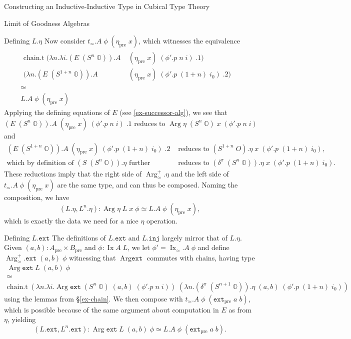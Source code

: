 \documentclass[runningheads]{llncs}
\DeclareMathOperator{\Arg}{Arg}
\DeclareMathOperator{\Ix}{Ix}
\newcommand{\pre}[1]{{#1}_\text{pre}}
\newcommand{\bbO}{\mathbb{O}}
\newcommand{\join}{\texttt{ext}}
\newcommand{\inj}{\texttt{inj}}
\begin{document}
\begin{section}{Constructing an Inductive-Inductive Type in Cubical Type Theory}
\begin{subsection}{Limit of Goodness Algebras}
{\begin{subsubsection}{Defining $L.\eta$}
Now consider $t_\simeq.A\;\phi\;(\pre{\eta}\;x)$, which witnesses the equivalence
\begin{gather*}
\begin{align*}
\text{chain.t}\;(\lambda n.\lambda i.(E\;(S^n\;\bbO)).A&\;(\pre{\eta}\;x)\;(\phi'.p\;n\;i)\;.1)&\\(\lambda n.(E\;(S^{1+n}\;\bbO)).A&\;(\pre{\eta}\;x)\;(\phi'.p\;(1+n)\;i_0)\;.2)&
\end{align*}\\
\simeq\\
L.A\;\phi\;(\pre{\eta}\;x)
\end{gather*}
Applying the defining equations of $E$ (see \ref{ex-successor-alg}), we see that
\[(E\;(S^n\;\bbO)).A\;(\pre{\eta}\;x)\;(\phi'.p\;n\;i)\;.1\text{ reduces to } \Arg\eta\;(S^n\;\bbO)\;x\;(\phi'.p\;n\;i)\]
and
\begin{align*}
(E\;(S^{1+n}\;\bbO)).A\;(\pre{\eta}\;x)\;(\phi'.p\;(1+n)\;i_0)\;.2&\text{ reduces to } (S^{1+n}\;O).\eta\;x\;(\phi'.p\;(1+n)\;i_0),\\
\text{which by definition of $(S\;(S^n\;\bbO)).\eta$ further}&\text{ reduces to } (\delta^\pi\;(S^n\;\bbO)).\eta\;x\;(\phi'.p\;(1+n)\;i_0).
\end{align*}
These reductions imply that the right side of $\Arg_\simeq^+.\eta$ and the left side of $t_\simeq.A\;\phi\;(\pre{\eta}\;x)$ are the same type, and can thus be composed. Naming the composition, we have \[(L.\eta, L^n.\eta) : \Arg\eta\;L\;x\;\phi \simeq L.A\;\phi\;(\pre{\eta}\;x),\] which is exactly the data we need for a nice $\eta$ operation.
\end{subsubsection}

\begin{subsubsection}{Defining $L.\join$}
The definitions of $L.\join$ and $L.\inj$ largely mirror that of $L.\eta$.
Given $(a, b) : \pre{A} \times \pre{B}$ and $\phi : \Ix A\;L$, we let $\phi' = \Ix_\simeq.A\;\phi$ and define $\Arg_\simeq^+.\join\;(a,b)\;\phi$ witnessing that $\Arg\join$ commutes with chains, having type
\begin{gather*}
\Arg\join\;L\;(a,b)\;\phi\\
\simeq\\
\text{chain.t}\;(\lambda n.\lambda i.\Arg\join\;(S^n\;\bbO)\;(a,b)\;(\phi'.p\;n\;i))\;(\lambda n.(\delta^\pi\;(S^{n+1}\;\bbO)).\eta\;(a,b)\;(\phi'.p\;(1+n)\;i_0))
\end{gather*}
using the lemmas from \S\ref{ex-chain}. We then compose with $t_\simeq.A\;\phi\;(\pre{\join}\;a\;b)$, which is possible because of the same argument about computation in $E$ as from $\eta$, yielding \[(L.\join, L^n.\join) : \Arg\join\;L\;(a,b)\;\phi \simeq L.A\;\phi\;(\pre{\join}\;a\;b).\]
\end{subsubsection}

}
\end{subsection}
\end{section}
\end{document}
